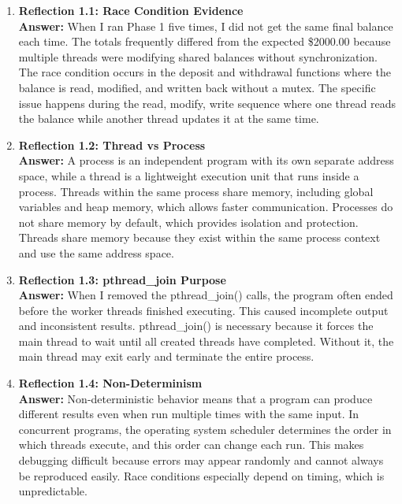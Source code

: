 \documentclass[12pt]{article}
\begin{document}
\begin{enumerate}
\item \textbf{Reflection 1.1: Race Condition Evidence} \\
\textbf{Answer:} When I ran Phase 1 five times, I did not get the same final balance each time. The totals frequently differed
 from the expected \$2000.00 because multiple threads were modifying shared balances without synchronization. The race condition occurs
 in the deposit and withdrawal functions where the balance is read, modified, and written back without a mutex. The specific issue
 happens during the read, modify, write sequence where one thread reads the balance while another thread updates it at the same time.

\item \textbf{Reflection 1.2: Thread vs Process} \\
\textbf{Answer:} A process is an independent program with its own separate address space, while a thread is a lightweight
 execution unit that runs inside a process. Threads within the same process share memory, including global variables and heap memory,
 which allows faster communication. Processes do not share memory by default, which provides isolation and protection. Threads share
 memory because they exist within the same process context and use the same address space. 

\item \textbf{Reflection 1.3: pthread\_join Purpose} \\
\textbf{Answer:} When I removed the pthread\_join() calls, the program often ended before the worker threads finished executing.
 This caused incomplete output and inconsistent results. pthread\_join() is necessary because it forces the main thread to wait until all
 created threads have completed. Without it, the main thread may exit early and terminate the entire process.

\item \textbf{Reflection 1.4: Non-Determinism} \\
\textbf{Answer:} Non-deterministic behavior means that a program can produce different results even when run multiple times with the
 same input. In concurrent programs, the operating system scheduler determines the order in which threads execute, and this order can change
 each run. This makes debugging difficult because errors may appear randomly and cannot always be reproduced easily. Race conditions
 especially depend on timing, which is unpredictable.


\end{enumerate}
\end{document}
